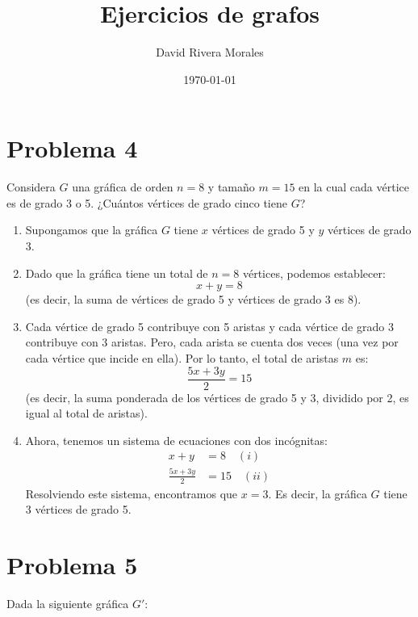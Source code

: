 \documentclass[12pt]{article}
\title{Ejercicios de grafos}
\author{David Rivera Morales}
\date{\today}
\begin{document}
\maketitle

\section*{Problema 4}
Considera \( G \) una gráfica de orden \( n = 8 \) y tamaño \( m = 15 \) en la cual cada vértice es de grado 3 o 5. ¿Cuántos vértices de grado cinco tiene \( G \)?
\begin{enumerate}
    \item Supongamos que la gráfica \( G \) tiene \( x \) vértices de grado 5 y \( y \) vértices de grado 3.
    \item Dado que la gráfica tiene un total de \( n = 8 \) vértices, podemos establecer:
    \[ x + y = 8 \]
    (es decir, la suma de vértices de grado 5 y vértices de grado 3 es 8).
    \item Cada vértice de grado 5 contribuye con 5 aristas y cada vértice de grado 3 contribuye con 3 aristas. Pero, cada arista se cuenta dos veces (una vez por cada vértice que incide en ella). Por lo tanto, el total de aristas \( m \) es:
    \[ \frac{5x + 3y}{2} = 15 \]
    (es decir, la suma ponderada de los vértices de grado 5 y 3, dividido por 2, es igual al total de aristas).
    \item Ahora, tenemos un sistema de ecuaciones con dos incógnitas:
    \begin{align*}
    x + y &= 8 \quad (i) \\
    \frac{5x + 3y}{2} &= 15 \quad (ii)
    \end{align*}
    Resolviendo este sistema, encontramos que \( x = 3 \). Es decir, la gráfica \( G \) tiene 3 vértices de grado 5.
\end{enumerate}


\section*{Problema 5}
Dada la siguiente gráfica \( G' \):
\end{document}

